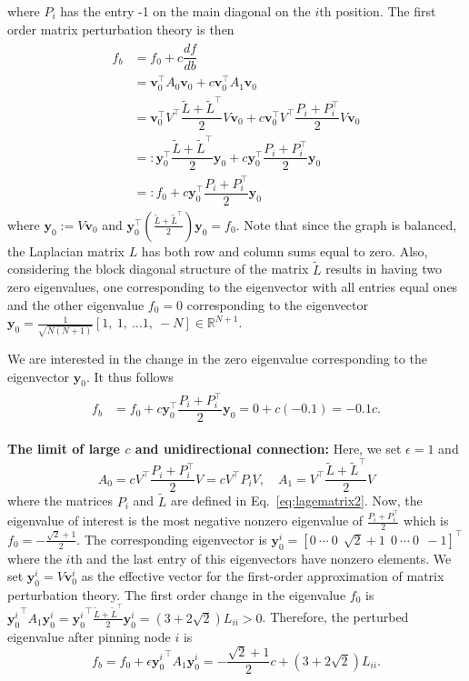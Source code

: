 \documentclass[%
 reprint,
 amsmath,amssymb,
 aip,
]{revtex4-2}
\def \by {\pmb{y}}
\def \bv {\pmb{v}}
\theoremstyle{italichead}
\theoremstyle{definition}
\begin{document}
{where $P_i$ has the entry -1 on the main diagonal on the $i$th position.
The first order matrix perturbation theory is then
\begin{align}
\begin{split}
    f_b & = f_0 + c \dfrac{df}{db} \\
    & = \bv_0^\top A_0 \bv_0 + c \bv_0^\top A_1 \bv_0 \\
    & = \bv_0^\top V^\top \dfrac{\tilde{L} + \tilde{L}^\top}{2} V \bv_0 + c \bv_0^\top V^\top \dfrac{P_i + P_i ^\top}{2} V \bv_0 \\
    & =: \by_0^\top \dfrac{\tilde{L} + \tilde{L}^\top}{2} \by_0 + c \by_0^\top \dfrac{P_i + P_i ^\top}{2} \by_0 \\
    & =: f_0 + c \by_0^\top \dfrac{P_i + P_i ^\top}{2} \by_0
\end{split}
\end{align}
where $\by_0 := V \bv_0$ and $\by_0^\top\left(\frac{\tilde{L} + \tilde{L}^\top}{2} \right) \by_0 = f_0 $. 
Note that since the graph is balanced, the Laplacian matrix $L$ has both row and column sums equal to zero. 
Also, considering the block diagonal structure of the matrix $\tilde{L}$ results in having two zero eigenvalues, one corresponding to the eigenvector with all entries equal ones and the other eigenvalue $f_0 = 0$ corresponding to the eigenvector $\by_0 = \frac{1}{\sqrt{N(N+1)}}[1, \ 1,\ \hdots 1, \ -N] \in \mathbb{R}^{N+1}$.

We are interested in the change in the zero eigenvalue corresponding to the eigenvector $\by_0$.
It thus follows
\begin{align}
\begin{split} \label{eq:smallb2}
    f_b & = f_0 + c \by_0^\top \dfrac{P_i + P_i ^\top}{2} \by_0 = 0 + c (-0.1) = -0.1 c.
\end{split}
\end{align}

\textbf{The limit of large $c$ and unidirectional connection:}
Here, we set $\epsilon = 1$ and
\begin{equation}
    A_0 = c V^\top \frac{P_i+P_i^\top}{2}V = c V^\top P_i V, \quad A_1 = V^\top \dfrac{\tilde{L} + \tilde{L}^\top}{2} V
\end{equation}
where the matrices $P_i$ and $\tilde{L}$ are defined in Eq.\, \eqref{eq:lagematrix2}.
Now, the eigenvalue of interest is the most negative nonzero eigenvalue of $\frac{P_i+P_i^\top}{2}$ which is $f_0 =  -\frac{\sqrt{2}+1}{2}$.
The corresponding eigenvector is $\by_0^i = [0 \ \cdots \ 0 \ \ {\sqrt{2}+1} \ \ 0 \ \cdots \ 0 \ \ -1]^\top$ where the $i$th and the last entry of this eigenvectors have nonzero elements.
We set $\by_0^i = V\bv_0^i$ as the effective vector for the first-order approximation of matrix perturbation theory.
The first order change in the eigenvalue $f_0$ is ${\by_0^i}^\top A_1 \by_0^i = {\by_0^i}^\top \frac{\tilde{L} + \tilde{L}^\top}{2} \by_0^i = (3+2\sqrt{2})  L_{ii} > 0$.
Therefore, the perturbed eigenvalue after pinning node $i$ is
\begin{equation}
    f_b = f_0 + \epsilon {\by_0^i}^\top A_1 \by_0^i = -\frac{\sqrt{2}+1}{2}c + (3+2\sqrt{2})  L_{ii}.
\end{equation}






}
\end{document}

